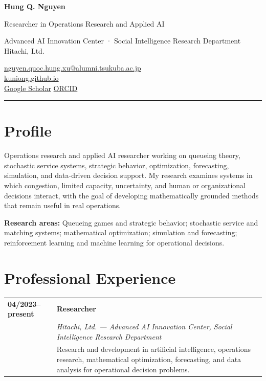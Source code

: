 \documentclass[10pt,a4paper]{article}
\makeatletter
\newcommand{\contactsep}{\hspace{0.45em}{\color{Gold}\textbullet}\hspace{0.45em}}
\newcommand{\cventry}[4]{%
  \Needspace{4\baselineskip}%
  \begin{tabularx}{\textwidth}{@{}>{\raggedright\arraybackslash\sffamily\bfseries\color{Teal}}p{0.175\textwidth}X@{}}
    #1 & \textbf{#2} \\
       & \textit{#3} \\
       & {\small #4}
  \end{tabularx}\vspace{5pt}
}
\makeatother
\begin{document}
\begin{minipage}[t]{0.58\textwidth}
  {\fontsize{25}{28}\selectfont\sffamily\bfseries\color{Navy} Hung Q. Nguyen}\par
  \vspace{3pt}
  {\large\sffamily\color{Teal}Researcher in Operations Research and Applied AI}\par
  \vspace{4pt}
  {\small\color{Muted}Advanced AI Innovation Center · Social Intelligence Research Department\\
  Hitachi, Ltd.}
\end{minipage}
\hfill
\begin{minipage}[t]{0.39\textwidth}
  \raggedleft\small\sffamily
  \href{mailto:nguyen.quoc.hung.xu@alumni.tsukuba.ac.jp}{nguyen.quoc.hung.xu@alumni.tsukuba.ac.jp}\\[2pt]
  \href{https://kuniong.github.io}{kuniong.github.io}\\[2pt]
  \href{https://scholar.google.com/citations?user=5o4yCtMAAAAJ}{Google Scholar}\contactsep
  \href{https://orcid.org/0000-0001-8934-0113}{ORCID}
\end{minipage}

\vspace{7pt}
{\color{Rule}\rule{\textwidth}{0.6pt}}

\section{Profile}
\begingroup
\setlength{\fboxsep}{8pt}
\noindent\colorbox{Pale}{%
  \parbox{\dimexpr\textwidth-2\fboxsep\relax}{%
    \small\color{Ink}
    Operations research and applied AI researcher working on queueing theory, stochastic service systems, strategic behavior, optimization, forecasting, simulation, and data-driven decision support. My research examines systems in which congestion, limited capacity, uncertainty, and human or organizational decisions interact, with the goal of developing mathematically grounded methods that remain useful in real operations.
  }%
}
\endgroup

\textbf{Research areas:} Queueing games and strategic behavior; stochastic service and matching systems; mathematical optimization; simulation and forecasting; reinforcement learning and machine learning for operational decisions.

\section{Professional Experience}
\cventry{04/2023--present}
  {Researcher}
  {Hitachi, Ltd. — Advanced AI Innovation Center, Social Intelligence Research Department}
  {Research and development in artificial intelligence, operations research, mathematical optimization, forecasting, and data analysis for operational decision problems.}
\end{document}
